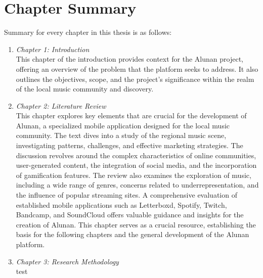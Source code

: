 \section{Chapter Summary}
Summary for every chapter in this thesis is as follows:
\begin{enumerate}[1.]
    \item \textit{Chapter 1: Introduction} \\
    This chapter of the introduction provides context for the Alunan project, offering an overview of the problem that the platform seeks to address. It also outlines the objectives, scope, and the project's significance within the realm of the local music community and discovery.
    \item \textit{Chapter 2: Literature Review} \\
    This chapter explores key elements that are crucial for the development of Alunan, a specialized mobile application designed for the local music community. The text dives into a study of the regional music scene, investigating patterns, challenges, and effective marketing strategies. The discussion revolves around the complex characteristics of online communities, user-generated content, the integration of social media, and the incorporation of gamification features. The review also examines the exploration of music, including a wide range of genres, concerns related to underrepresentation, and the influence of popular streaming sites. A comprehensive evaluation of established mobile applications such as Letterboxd, Spotify, Twitch, Bandcamp, and SoundCloud offers valuable guidance and insights for the creation of Alunan. This chapter serves as a crucial resource, establishing the basis for the following chapters and the general development of the Alunan platform.
    \item \textit{Chapter 3: Research Methodology} \\
    test
\end{enumerate}